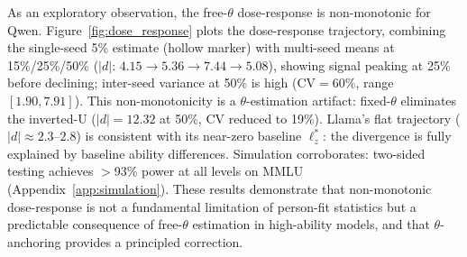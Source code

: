 As an exploratory observation, the free-$\theta$ dose-response is non-monotonic for Qwen.
Figure~\ref{fig:dose_response} plots the dose-response trajectory, combining the single-seed 5\% estimate (hollow marker) with multi-seed means at 15\%/25\%/50\% ($|d|$: $4.15 \to 5.36 \to 7.44 \to 5.08$), showing signal peaking at 25\% before declining; inter-seed variance at 50\% is high (CV${=}$60\%, range $[1.90, 7.91]$).
This non-monotonicity is a $\theta$-estimation artifact: fixed-$\theta$ eliminates the inverted-U ($|d|{=}12.32$ at 50\%, CV reduced to 19\%).
Llama's flat trajectory ($|d|{\approx}2.3$--$2.8$) is consistent with its near-zero baseline $\ell_z^*$: the divergence is fully explained by baseline ability differences.
Simulation corroborates: two-sided testing achieves ${>}$93\% power at all levels on MMLU (Appendix~\ref{app:simulation}).
These results demonstrate that non-monotonic dose-response is not a fundamental limitation of person-fit statistics but a predictable consequence of free-$\theta$ estimation in high-ability models, and that $\theta$-anchoring provides a principled correction.
